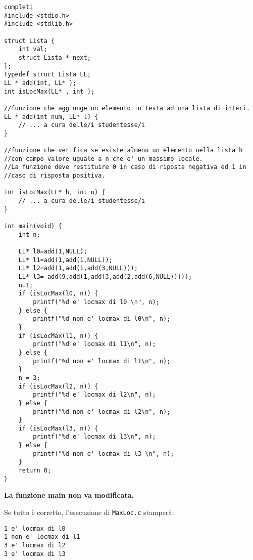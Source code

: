 \documentclass[12pt]{article}
\begin{document}
\begin{lstlisting}[language=myC]completi
#include <stdio.h>
#include <stdlib.h>

struct Lista {
    int val;
    struct Lista * next;
};
typedef struct Lista LL;
LL * add(int, LL* );
int isLocMax(LL* , int );

//funzione che aggiunge un elemento in testa ad una lista di interi.
LL * add(int num, LL* l) {
    // ... a cura delle/i studentesse/i
}

//funzione che verifica se esiste almeno un elemento nella lista h 
//con campo valore uguale a n che e' un massimo locale.
//La funzione deve restituire 0 in caso di riposta negativa ed 1 in 
//caso di risposta positiva.

int isLocMax(LL* h, int n) {
    // ... a cura delle/i studentesse/i
}

int main(void) {
    int n;
    
    LL* l0=add(1,NULL);
    LL* l1=add(1,add(1,NULL));
    LL* l2=add(1,add(1,add(3,NULL)));
    LL* l3= add(9,add(1,add(3,add(2,add(6,NULL)))));
    n=1;
    if (isLocMax(l0, n)) {
        printf("%d e' locmax di l0 \n", n);
    } else {
        printf("%d non e' locmax di l0\n", n);
    }
    if (isLocMax(l1, n)) {
        printf("%d e' locmax di l1\n", n);
    } else {
        printf("%d non e' locmax di l1\n", n);
    }
    n = 3;
    if (isLocMax(l2, n)) {
        printf("%d e' locmax di l2\n", n);
    } else {
        printf("%d non e' locmax di l2\n", n);
    }
    if (isLocMax(l3, n)) {
        printf("%d e' locmax di l3\n", n);
    } else {
        printf("%d non e' locmax di l3 \n", n);
    }
    return 0;
}
\end{lstlisting}
\begin{mdframed}[backgroundcolor=lightred] 
  \vspace*{-0.5ex}
  \textbf{La funzione main non va modificata.}
\end{mdframed}
%
Se tutto \`e corretto, l'esecuzione di \texttt{MaxLoc.c} stamperà:

%
\begin{mdframed}[backgroundcolor=verylightgray] 
\begin{verbatim}
1 e' locmax di l0
1 non e' locmax di l1
3 e' locmax di l2
3 e' locmax di l3
\end{verbatim}
\end{mdframed}

	
	
	
\end{document}
